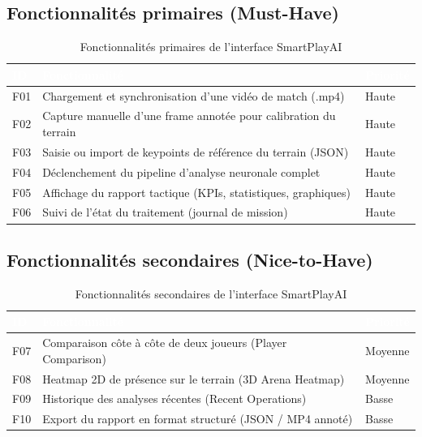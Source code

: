 \subsection*{Fonctionnalités primaires (Must-Have)}
 
\begin{table}[H]
  \centering
  \tablestyle
  \begin{tabularx}{\textwidth}{C{1.2cm} X C{2.2cm}}
    \toprule
    \textcolor{white}{\textbf{ID}} & \textcolor{white}{\textbf{Fonctionnalité}} & \textcolor{white}{\textbf{Priorité}} \\
    \midrule
    F01 & Chargement et synchronisation d'une vidéo de match (.mp4) & Haute \\
    F02 & Capture manuelle d'une frame annotée pour calibration du terrain & Haute \\
    F03 & Saisie ou import de keypoints de référence du terrain (JSON) & Haute \\
    F04 & Déclenchement du pipeline d'analyse neuronale complet & Haute \\
    F05 & Affichage du rapport tactique (KPIs, statistiques, graphiques) & Haute \\
    F06 & Suivi  de l'état du traitement (journal de mission) & Haute \\
    \bottomrule
  \end{tabularx}
  \caption{Fonctionnalités primaires de l'interface SmartPlayAI}
  \label{tab:fonctionnalites_primaires}
\end{table}
 
\subsection*{Fonctionnalités secondaires (Nice-to-Have)}
 
\begin{table}[H]
  \centering
  \tablestyle
  \begin{tabularx}{\textwidth}{C{1.2cm} X C{2.2cm}}
    \toprule
    \textcolor{white}{\textbf{ID}} & \textcolor{white}{\textbf{Fonctionnalité}} & \textcolor{white}{\textbf{Priorité}} \\
    \midrule
    F07 & Comparaison côte à côte de deux joueurs (Player Comparison) & Moyenne \\
    F08 & Heatmap 2D de présence sur le terrain (3D Arena Heatmap) & Moyenne \\
    F09 & Historique des analyses récentes (Recent Operations) & Basse \\
    F10 & Export du rapport en format structuré (JSON / MP4 annoté) & Basse \\
    \bottomrule
  \end{tabularx}
  \caption{Fonctionnalités secondaires de l'interface SmartPlayAI}
  \label{tab:fonctionnalites_secondaires}
\end{table}
 
